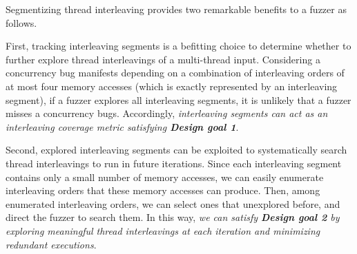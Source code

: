 



%
Segmentizing thread interleaving provides two remarkable benefits to a
fuzzer as follows.



First, tracking interleaving segments is a befitting choice to
determine whether to further explore thread interleavings of a
multi-thread input.
%
%
Considering a concurrency bug manifests depending on a combination of
interleaving orders of at most four memory accesses (which is exactly
represented by an interleaving segment), if a fuzzer explores all
interleaving segments, it is unlikely that a fuzzer misses a
concurrency bugs.
%
Accordingly, \textit{interleaving segments can act as an
  interleaving coverage metric satisfying \textbf{Design goal 1}}.





\dr{}
Second, explored interleaving segments can be exploited to
systematically search thread interleavings to run in future
iterations.
%
Since each interleaving segment contains only a small number of memory
accesses, we can easily enumerate interleaving orders that these
memory accesses can produce.
%
Then, among enumerated interleaving orders, we can select ones that
unexplored before, and direct the fuzzer to search them.
%
In this way, \textit{we can satisfy \textbf{Design goal 2} by
  exploring meaningful thread interleavings at each iteration and
  minimizing redundant executions}.


